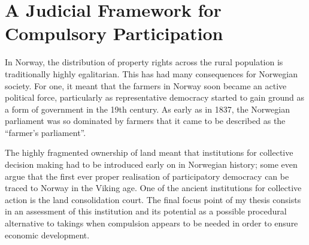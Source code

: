 \section{A Judicial Framework for Compulsory Participation}\label{sec:4}

In Norway, the distribution of property rights across the rural population is traditionally highly egalitarian. This has had many consequences for Norwegian society. For one, it meant that the farmers in Norway soon became an active political force, particularly as representative democracy started to gain ground as a form of government in the 19th century. As early as in 1837, the Norwegian parliament was so dominated by farmers that it came to be described as the ``farmer's parliament''.


The highly fragmented ownership of land meant that institutions for collective decision making had to be introduced early on in Norwegian history; some even argue that the first ever proper realisation of participatory democracy can be traced to Norway in the Viking age. One of the ancient institutions for collective action is the land consolidation court. The final focus point of my thesis consists in an assessment of this institution and its potential as a possible procedural alternative to takings when compulsion appears to be needed in order to ensure economic development.

